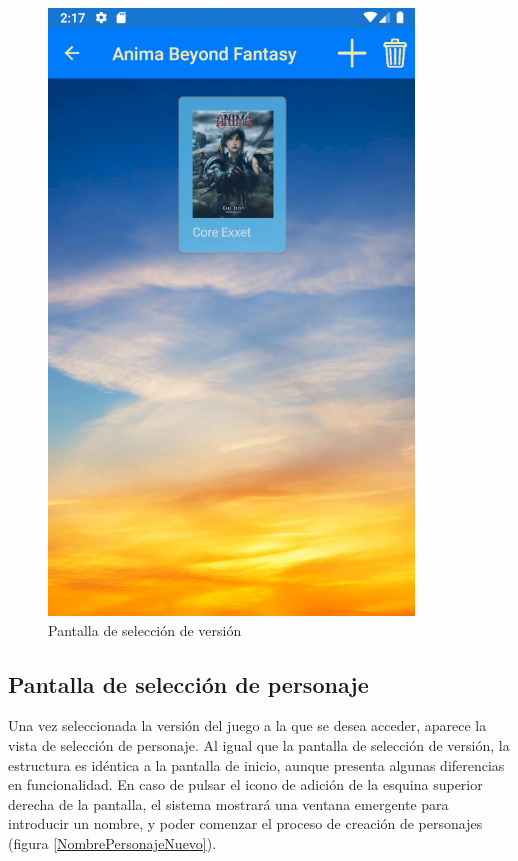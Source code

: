 \begin{figure}[H]
    \centering
    \includegraphics[scale=0.7]{Figures/Capturas/SeleccionVersion.png}
    \caption{Pantalla de selección de versión}
    \label{SeleccionVersion}    
\end{figure}

\subsection{Pantalla de selección de personaje}
Una vez seleccionada la versión del juego a la que se desea acceder, aparece la vista de selección de personaje.
Al igual que la pantalla de selección de versión, la estructura es idéntica a la pantalla de inicio, aunque presenta 
algunas diferencias en funcionalidad. En caso de pulsar el icono de adición de la esquina superior derecha de la pantalla, 
el sistema mostrará una ventana emergente para introducir un nombre, y poder comenzar el proceso de creación de personajes 
(figura \ref*{NombrePersonajeNuevo}).

